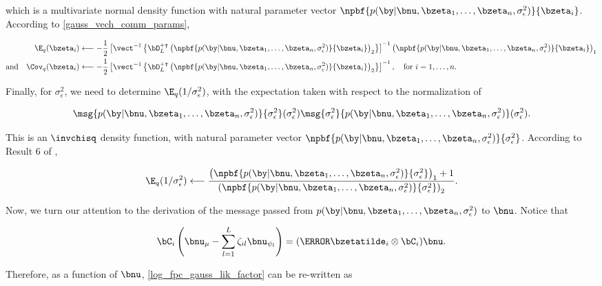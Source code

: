 \documentclass[12pt]{article}
\def\sigsqeps{\sigma^2_{\epsilon}}
\def\numu{\bnu_\mu}
\newcommand\nupsi[1]{\bnu_{\psi_{#1}}}
\theoremstyle{plain}
\theoremstyle{definition}
\theoremstyle{remark}
\begin{document}
\noindent which is a multivariate normal density function with natural parameter vector $\npbf{p (\by | \bnu, \bzeta_1,
\dots, \bzeta_n, \sigsqeps)}{\bzeta_i}$. According to \eqref{gauss_vech_comm_params},

\begin{align}
\begin{split}
	\E_q (\bzeta_i)
		&\longleftarrow
			-\frac12 \left[
				\vect^{-1} \left\{
					\bD_L^{+ \intercal}
					\left( \npbf{p (\by | \bnu, \bzeta_1, \dots, \bzeta_n, \sigsqeps)}{\bzeta_i} \right)_2
				\right\}
			\right]^{-1} \left( \npbf{p (\by | \bnu, \bzeta_1, \dots, \bzeta_n, \sigsqeps)}{\bzeta_i} \right)_1 \\
	\text{and} \quad
	\Cov_q (\bzeta_i)
		&\longleftarrow
			-\frac12 \left[
				\vect^{-1} \left\{
					\bD_L^{+ \intercal}
					\left( \npbf{p (\by | \bnu, \bzeta_1, \dots, \bzeta_n, \sigsqeps)}{\bzeta_i} \right)_2
				\right\}
			\right]^{-1}, \quad \text{for $i = 1, \dots, n$.}
\end{split}
\label{exp_lik_zeta}
\end{align}

\noindent Finally, for $\sigsqeps$, we need to determine $\E_q (1/\sigsqeps)$, with the expectation taken with
respect to the normalization of

\[
	\msg{p (\by | \bnu, \bzeta_1, \dots, \bzeta_n, \sigsqeps)}{\sigsqeps} (\sigsqeps)
	\msg{\sigsqeps}{p (\by | \bnu, \bzeta_1, \dots, \bzeta_n, \sigsqeps)} (\sigsqeps).
\]

\noindent This is an $\invchisq$ density function, with natural parameter vector $\npbf{p (\by | \bnu, \bzeta_1, \dots,
\bzeta_n, \sigsqeps)}{\sigsqeps}$. According to Result 6 of ,

\[
	\E_q (1/\sigsqeps)
		\longleftarrow
			\frac{
				\left( \npbf{p (\by | \bnu, \bzeta_1, \dots, \bzeta_n, \sigsqeps)}{\sigsqeps} \right)_1 + 1
			}{
				\left( \npbf{p (\by | \bnu, \bzeta_1, \dots, \bzeta_n, \sigsqeps)}{\sigsqeps} \right)_2
			}.
\]

Now, we turn our attention to the derivation of the message passed from $p (\by | \bnu, \bzeta_1, \dots, \bzeta_n,
\sigsqeps)$ to $\bnu$. Notice that

\begin{equation}
	\bC_i \left( \numu - \sum_{l=1}^L \zeta_{il} \nupsi{l} \right) = (\T{\bzetatilde_i} \otimes \bC_i) \bnu.
\label{theta_simplification}
\end{equation}

\noindent Therefore, as a function of $\bnu$, \eqref{log_fpc_gauss_lik_factor} can be re-written as
\end{document}
